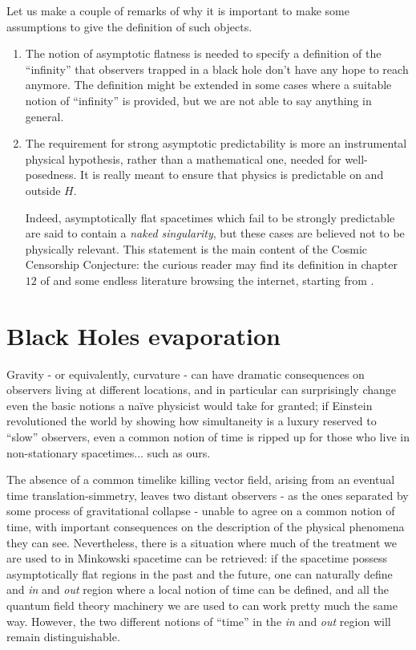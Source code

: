 \begin{remark}
	Let us make a couple of remarks of why it is important to make some assumptions to give the definition of such objects.
	\begin{enumerate}[label=(\Roman*)]
		\item The notion of asymptotic flatness is needed to specify a definition of the ``infinity'' that observers trapped in a black hole don't have any hope to reach anymore. The definition might be extended in some cases where a suitable notion of ``infinity'' is provided, but we are not able to say anything in general.
		\item The requirement for strong asymptotic predictability is more an instrumental physical hypothesis, rather than a mathematical one, needed for well-posedness. It is really meant to ensure that physics is predictable on and outside \(H\).
		
		Indeed, asymptotically flat spacetimes which fail to be strongly predictable are said to contain a \emph{naked singularity}, but these cases are believed not to be physically relevant. This statement is the main content of the Cosmic Censorship Conjecture: the curious reader may find its definition in chapter \(12\) of \cite{wald2010general} and some endless literature browsing the internet, starting from \cite{dias2018strong}.
	\end{enumerate}
\end{remark}


\section{Black Holes evaporation}
\label{sec:black-holes-evaporation}
Gravity - or equivalently, curvature - can have dramatic consequences on observers living at different locations, and in particular can surprisingly change even the basic notions a na\"ive physicist would take for granted; if Einstein revolutioned the world by showing how simultaneity is a luxury reserved to ``slow'' observers, even a common notion of time is ripped up for those who live in non-stationary spacetimes... such as ours.

\noindent
The absence of a common timelike killing vector field, arising from an eventual time translation-simmetry, leaves two distant observers - as the ones separated by some process of gravitational collapse - unable to agree on a common notion of time, with important consequences on the description of the physical phenomena they can see.
Nevertheless, there is a situation where much of the treatment we are used to in Minkowski spacetime can be retrieved: if the spacetime possess asymptotically flat regions in the past and the future, one can naturally define and \emph{in} and \emph{out} region where a local notion of time can be defined, and all the quantum field theory machinery we are used to can work pretty much the same way.
However, the two different notions of ``time'' in the \emph{in} and \emph{out} region will remain distinguishable.

